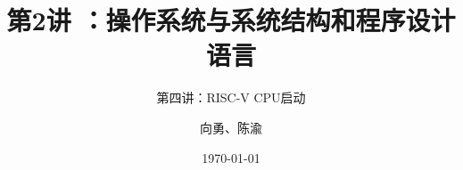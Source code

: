 


\title[第2讲]{第2讲 ：操作系统与系统结构和程序设计语言} %
\subtitle{第四讲：RISC-V CPU启动}
\author{向勇、陈渝} %
\date{\today} %



\begin{frame}
\titlepage %
\end{frame}




